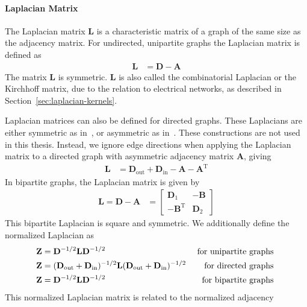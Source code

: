 \documentclass[11pt,a4paper]{book}
\begin{document}
\paragraph{Laplacian Matrix}
The Laplacian matrix $\mathbf L$ is a characteristic matrix of a graph
of the same size as the adjacency matrix. 
For undirected, unipartite graphs the Laplacian matrix is defined as 
\begin{align}
  \mathbf L &= \mathbf D - \mathbf A
  \label{eq:laplacian-matrix}
\end{align}
The matrix $\mathbf L$ is symmetric.  $\mathbf L$ is also called the
combinatorial Laplacian or the Kirchhoff matrix, due to the relation to
electrical networks, as described in
Section~\ref{sec:laplacian-kernels}. 

Laplacian matrices can also be defined for directed graphs.  These
Laplacians are either symmetric as in~\cite{b264}, or asymmetric as
in~\cite{b654}. 
These constructions are not used in this thesis.  Instead, we ignore edge
directions when applying the 
Laplacian matrix to a directed graph with asymmetric adjacency matrix
$\mathbf A$, giving
\begin{align}
  \mathbf L &= \mathbf D_{\mathrm{out}} + \mathbf D_{\mathrm{in}} -
  \mathbf A - \mathbf A^{\mathrm T} 
\end{align}
In bipartite graphs, the Laplacian matrix is given by
\begin{align}
  \mathbf L = \mathbf D - \mathbf A &= \left[ \begin{array}{cc} \mathbf
      D_1 & - \mathbf B 
      \\ -\mathbf B^{\mathrm T} & \mathbf D_2 \end{array} \right] 
\end{align}
This bipartite Laplacian is square and symmetric.  
We additionally define the normalized Laplacian as 
\begin{align}
  \mathbf Z &= \mathbf D^{-1/2} \mathbf L \mathbf D^{-1/2} &
  \textnormal{ for unipartite graphs } 
  \label{eq:normalized-laplacian-matrix} \\
  \mathbf Z &= (\mathbf D_{\mathrm{out}} + \mathbf D_{\mathrm{in}})^{-1/2} 
  \mathbf L (\mathbf D_{\mathrm{out}} + \mathbf D_{\mathrm{in}})^{-1/2} & 
  \textnormal{ for directed graphs } \\
  \mathbf Z &= \mathbf D^{-1/2} \mathbf L \mathbf D^{-1/2} & \textnormal{
    for bipartite graphs } 
\end{align}
This normalized Laplacian matrix is related to the normalized adjacency
\end{document}
